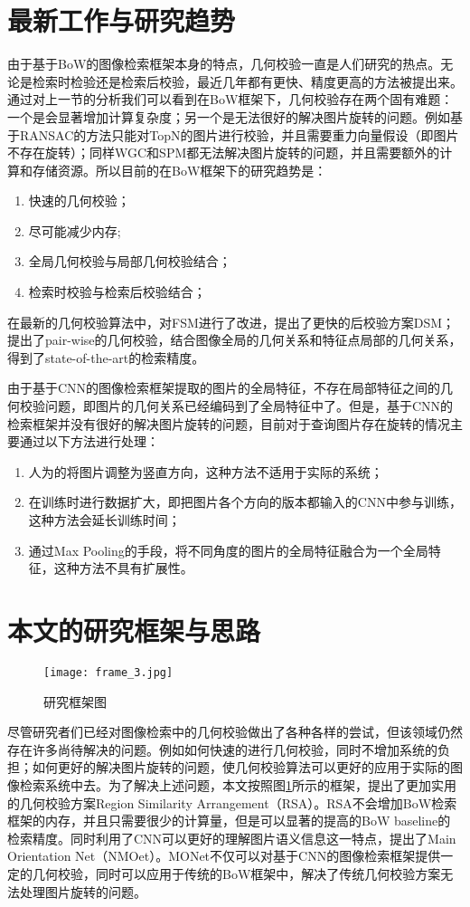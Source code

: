 \section{最新工作与研究趋势}
由于基于BoW的图像检索框架本身的特点，几何校验一直是人们研究的热点。无论是检索时检验还是检索后校验，最近几年都有更快、精度更高的方法被提出来。通过对上一节的分析我们可以看到在BoW框架下，几何校验存在两个固有难题：一个是会显著增加计算复杂度；另一个是无法很好的解决图片旋转的问题。例如基于RANSAC的方法\cite{philbin2007object}\cite{chum2007total}只能对TopN的图片进行校验，并且需要重力向量假设（即图片不存在旋转）；同样WGC和SPM都无法解决图片旋转的问题，并且需要额外的计算和存储资源。所以目前的在BoW框架下的研究趋势是：
\begin{enumerate}
	\item 快速的几何校验；
	\item 尽可能减少内存;
	\item 全局几何校验与局部几何校验结合；
	\item 检索时校验与检索后校验结合；
\end{enumerate}

在最新的几何校验算法中，\cite{Zhong2015Fast}对FSM进行了改进，提出了更快的后校验方案DSM；\cite{li2015pairwise}提出了pair-wise的几何校验，结合图像全局的几何关系和特征点局部的几何关系，得到了state-of-the-art的检索精度。

由于基于CNN的图像检索框架提取的图片的全局特征，不存在局部特征之间的几何校验问题，即图片的几何关系已经编码到了全局特征中了。但是，基于CNN的检索框架并没有很好的解决图片旋转的问题，目前对于查询图片存在旋转的情况主要通过以下方法进行处理：
\begin{enumerate}
	\item 人为的将图片调整为竖直方向\cite{babenko2014neural}，这种方法不适用于实际的系统；
	\item 在训练时进行数据扩大，即把图片各个方向的版本都输入的CNN中参与训练\cite{babenko2014neural}，这种方法会延长训练时间；
	\item 通过Max Pooling的手段，将不同角度的图片的全局特征融合为一个全局特征\cite{chandrasekhar2015practical}，这种方法不具有扩展性。
\end{enumerate}


\section{本文的研究框架与思路}
\begin{figure}[h]
	\centering
	\texttt{[image: frame\_3.jpg]}
	\caption{研究框架图}\label{fig:frame}
\end{figure}
尽管研究者们已经对图像检索中的几何校验做出了各种各样的尝试，但该领域仍然存在许多尚待解决的问题。例如如何快速的进行几何校验，同时不增加系统的负担；如何更好的解决图片旋转的问题，使几何校验算法可以更好的应用于实际的图像检索系统中去。为了解决上述问题，本文按照图\ref{fig:frame}所示的框架，提出了更加实用的几何校验方案Region Similarity Arrangement（RSA）。RSA不会增加BoW检索框架的内存，并且只需要很少的计算量，但是可以显著的提高的BoW baseline的检索精度。同时利用了CNN可以更好的理解图片语义信息这一特点，提出了Main Orientation Net（NMOet）。MONet不仅可以对基于CNN的图像检索框架提供一定的几何校验，同时可以应用于传统的BoW框架中，解决了传统几何校验方案无法处理图片旋转的问题。

